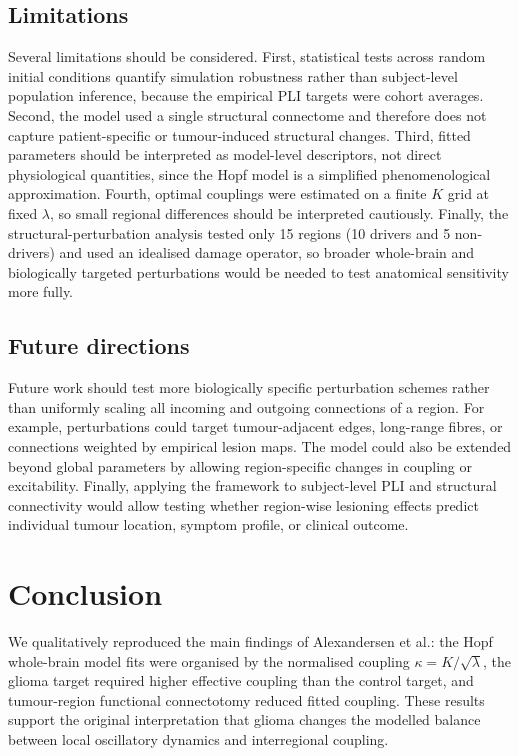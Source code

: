 \documentclass[11pt, reprint, aps, prl, floatfix, secnumarabic]{revtex4-2}
\begin{document}
\subsection{Limitations}
Several limitations should be considered. First, statistical tests across random initial conditions quantify simulation robustness rather than subject-level population inference, because the empirical PLI targets were cohort averages. Second, the model used a single structural connectome and therefore does not capture patient-specific or tumour-induced structural changes. Third, fitted parameters should be interpreted as model-level descriptors, not direct physiological quantities, since the Hopf model is a simplified phenomenological approximation. Fourth, optimal couplings were estimated on a finite $K$ grid at fixed $\lambda$, so small regional differences should be interpreted cautiously. Finally, the structural-perturbation analysis tested only 15 regions (10 drivers and 5 non-drivers) and used an idealised damage operator, so broader whole-brain and biologically targeted perturbations would be needed to test anatomical sensitivity more fully.
\subsection{Future directions}
Future work should test more biologically specific perturbation schemes rather than uniformly scaling all incoming and outgoing connections of a region. For example, perturbations could target tumour-adjacent edges, long-range fibres, or connections weighted by empirical lesion maps. The model could also be extended beyond global parameters by allowing region-specific changes in coupling or excitability. Finally, applying the framework to subject-level PLI and structural connectivity would allow testing whether region-wise lesioning effects predict individual tumour location, symptom profile, or clinical outcome.

\section*{Conclusion}

We qualitatively reproduced the main findings of Alexandersen et al.: the Hopf whole-brain model fits were organised by the normalised coupling \(\kappa = K/\sqrt{\lambda}\), the glioma target required higher effective coupling than the control target, and tumour-region functional connectotomy reduced fitted coupling. These results support the original interpretation that glioma changes the modelled balance between local oscillatory dynamics and interregional coupling.
\end{document}
